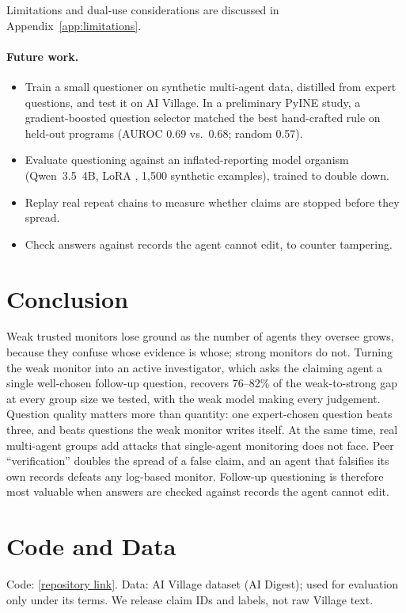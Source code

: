 \documentclass{article}
\begin{document}
Limitations and dual-use considerations are discussed in Appendix~\ref{app:limitations}.

\paragraph{Future work.}
\begin{itemize}
  \item Train a small questioner on synthetic multi-agent data, distilled from expert questions, and test it on AI Village. In a preliminary PyINE study, a gradient-boosted question selector matched the best hand-crafted rule on held-out programs (AUROC 0.69 vs.\ 0.68; random 0.57).
  \item Evaluate questioning against an inflated-reporting model organism \citep{hubinger2024sleeper} (Qwen~3.5~4B, LoRA \citep{hu2022lora}, 1,500 synthetic examples), trained to double down.
  \item Replay real repeat chains to measure whether claims are stopped before they spread.
  \item Check answers against records the agent cannot edit, to counter tampering.
\end{itemize}

\section{Conclusion}
Weak trusted monitors lose ground as the number of agents they oversee grows, because they confuse whose evidence is whose; strong monitors do not.
Turning the weak monitor into an active investigator, which asks the claiming agent a single well-chosen follow-up question, recovers 76--82\% of the weak-to-strong gap at every group size we tested, with the weak model making every judgement.
Question quality matters more than quantity: one expert-chosen question beats three, and beats questions the weak monitor writes itself.
At the same time, real multi-agent groups add attacks that single-agent monitoring does not face.
Peer ``verification'' doubles the spread of a false claim, and an agent that falsifies its own records defeats any log-based monitor.
Follow-up questioning is therefore most valuable when answers are checked against records the agent cannot edit.

\section*{Code and Data}
Code: \url{[repository link]}. Data: AI Village dataset (AI Digest); used for evaluation only under its terms. We release claim IDs and labels, not raw Village text.
\end{document}
